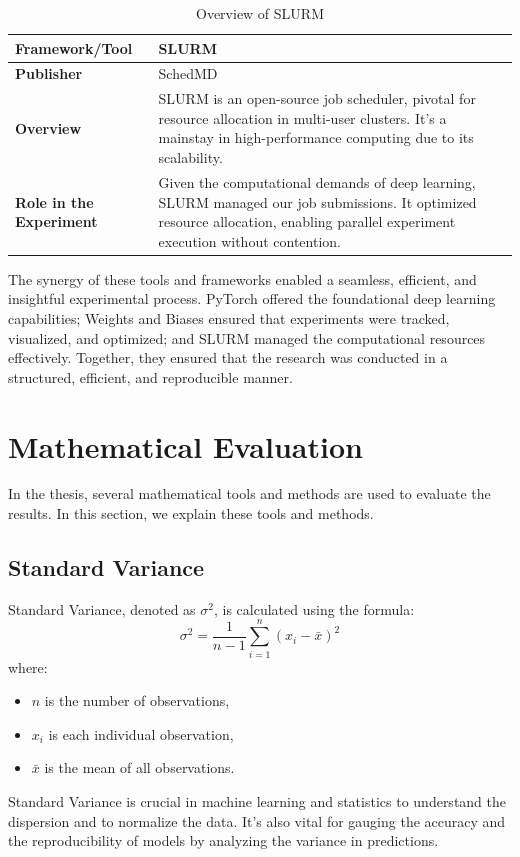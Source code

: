 \begin{table}[h]
    \centering
    \renewcommand{\arraystretch}{1.5}
    \begin{tabular}{|l|p{10cm}|}
    \hline
    \textbf{Framework/Tool} & \textbf{SLURM} \\
    \hline
    \textbf{Publisher} & SchedMD \\
    \hline
    \textbf{Overview} & SLURM is an open-source job scheduler, pivotal for resource allocation in multi-user clusters. It's a mainstay in high-performance computing due to its scalability. \\
    \hline
    \textbf{Role in the Experiment} & Given the computational demands of deep learning, SLURM managed our job submissions. It optimized resource allocation, enabling parallel experiment execution without contention. \\
    \hline
    \end{tabular}
    \caption{Overview of SLURM}
\end{table}

The synergy of these tools and frameworks enabled a seamless, efficient, and insightful experimental process. PyTorch offered the foundational deep learning capabilities; Weights and Biases ensured that experiments were tracked, visualized, and optimized; and SLURM managed the computational resources effectively. Together, they ensured that the research was conducted in a structured, efficient, and reproducible manner.
 
\section{Mathematical Evaluation}

In the thesis, several mathematical tools and methods are used to evaluate the results. In this section, we explain these tools and methods.

\subsection*{Standard Variance}
Standard Variance, denoted as \( \sigma^2 \), is calculated using the formula:
\[ \sigma^2 = \frac{1}{n-1} \sum_{i=1}^n (x_i - \bar{x})^2 \]
where:
\begin{itemize}
    \item \( n \) is the number of observations,
    \item \( x_i \) is each individual observation,
    \item \( \bar{x} \) is the mean of all observations.
\end{itemize}
Standard Variance is crucial in machine learning and statistics to understand the dispersion and to normalize the data. It's also vital for gauging the accuracy and the reproducibility of models by analyzing the variance in predictions.

